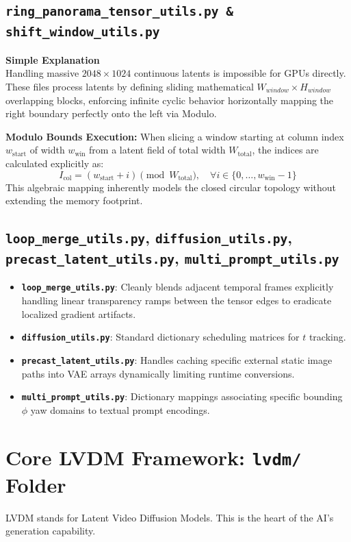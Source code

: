 \documentclass[11pt,a4paper]{article}
\begin{document}
\subsection{\texttt{ring\_panorama\_tensor\_utils.py \& shift\_window\_utils.py}}
\begin{simplebox}
\textbf{Simple Explanation} \\
Handling massive $2048 \times 1024$ continuous latents is impossible for GPUs directly. These files process latents by defining sliding mathematical $W_{window} \times H_{window}$ overlapping blocks, enforcing infinite cyclic behavior horizontally mapping the right boundary perfectly onto the left via Modulo.
\end{simplebox}

\textbf{Modulo Bounds Execution:}
When slicing a window starting at column index $w_{\text{start}}$ of width $w_{\text{win}}$ from a latent field of total width $W_{\text{total}}$, the indices are calculated explicitly as:
\[ I_{\text{col}} = (w_{\text{start}} + i) \pmod{W_{\text{total}}}, \quad \forall i \in \{0, \dots, w_{\text{win}}-1\} \]
This algebraic mapping inherently models the closed circular topology without extending the memory footprint.

\subsection{\texttt{loop\_merge\_utils.py}, \texttt{diffusion\_utils.py}, \texttt{precast\_latent\_utils.py}, \texttt{multi\_prompt\_utils.py}}
\begin{itemize}
    \item \textbf{\texttt{loop\_merge\_utils.py}}: Cleanly blends adjacent temporal frames explicitly handling linear transparency ramps between the tensor edges to eradicate localized gradient artifacts.
    \item \textbf{\texttt{diffusion\_utils.py}}: Standard dictionary scheduling matrices for $t$ tracking.
    \item \textbf{\texttt{precast\_latent\_utils.py}}: Handles caching specific external static image paths into VAE arrays dynamically limiting runtime conversions.
    \item \textbf{\texttt{multi\_prompt\_utils.py}}: Dictionary mappings associating specific bounding $\phi$ yaw domains to textual prompt encodings.
\end{itemize}


\section{Core LVDM Framework: \texttt{lvdm/} Folder}
LVDM stands for Latent Video Diffusion Models. This is the heart of the AI's generation capability.
\end{document}
